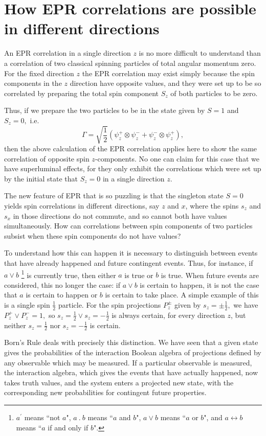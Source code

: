 \documentclass[12pt]{article}
\begin{document}
\section{How EPR correlations are possible in different directions}
An EPR correlation in a single direction $z$ is no more difficult to understand than a correlation of two classical spinning particles of total angular momentum zero. For the fixed direction $z$ the EPR correlation may exist simply because the spin components in the $z$ direction have opposite values, and they were set up to be so correlated by preparing the total spin component $S_z$ of both particles to be zero. 

Thus, if we prepare the two particles to be in the state given by $S =1$ and $ S_z = 0,$ i.e. 
$$\Gamma = \sqrt{\frac{1}{2}}(\psi_z^+\otimes \psi_z^- + \psi_z^-\otimes \psi_z^+),$$
then the above calculation of the EPR correlation applies here to show the same correlation of opposite spin $z$-components. No one can claim for this case that we have superluminal effects, for they only exhibit the correlations which were set up by the initial state that $S_z = 0$ in a single direction $z$.

The new feature of EPR that is so puzzling is that the singleton state $S = 0$ yields spin correlations in different directions, say $z$ and $x$, where the spins $s_z$ and $s_x$ in those directions do not commute, and so cannot both have values simultaneously. How can correlations between spin components of two particles subsist when these spin components do not have values?

To understand how this can happen it is necessary to distinguish between events that have already happened and future contingent events. Thus, for instance, if $a \vee b$  \footnote{$a^\prime$ means ``not $a$", $a\ .\ b$ means ``$a$ and $b$", $a \vee b$ means ``$a$ or $b$", and $a\leftrightarrow b$ means ``$a$ if and only if $b$".} is currently true, then either $a$ is true or $b$ is true. When future events are considered, this no longer the case: if $a \vee b$ is certain to happen, it is not the case that $a$ is certain to happen or $b$ is certain to take place. A simple example of this is a single spin $\frac{1}{2}$ particle. For the spin projections $P_z^\pm$ given by $s_z= \pm\frac{1}{2},$ we have $P_z^+\vee P_z^- = 1,$ so $s_z = \frac{1}{2} \vee s_z = -\frac{1}{2}$ is always certain, for every direction $z$, but neither $s_z = \frac{1}{2}$ nor $s_z = -\frac{1}{2}$ is certain.

Born's Rule deals with precisely this distinction. We have seen that a given state gives the probabilities of the interaction Boolean algebra of projections defined by any observable which may be measured. If a particular observable is measured, the interaction algebra, which gives the events that have actually happened, now takes truth values, and the system enters a projected new state, with the corresponding new probabilities for contingent future properties. 
\end{document}
